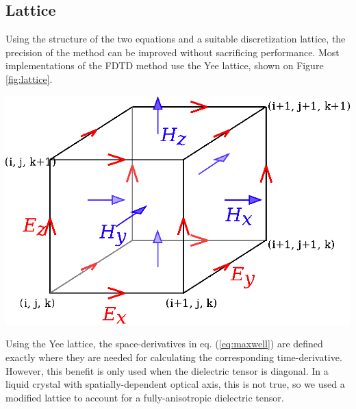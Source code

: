 \documentclass[a4paper,10pt]{article}
\renewenvironment{figure}
  {\par\medskip\noindent\minipage{\linewidth}}
  {\endminipage\par\medskip}
\begin{document}
\begin{multicols}{2}
\subsection{Lattice}
Using the structure of the two equations and a suitable discretization lattice, the precision of the method can be improved without sacrificing performance. 
Most implementations of the \textsc{FDTD} method use the Yee lattice\cite{yee, taflove, yee-lattice}, shown on Figure \ref{fig:lattice}. 

\begin{figure}
 \centering
 \includegraphics[width=.5\textwidth]{Yee-cube}
\label{fig:lattice}
\end{figure}

Using the Yee lattice, the space-derivatives in eq. (\ref{eq:maxwell}) are defined exactly where they are needed for calculating the corresponding time-derivative. 
However, this benefit is only used when the dielectric tensor is diagonal. 
In a liquid crystal with spatially-dependent optical axis, this is not true, so we used a modified lattice to account for a fully-anisotropic dielectric tensor. 


\end{multicols}
\end{document}
